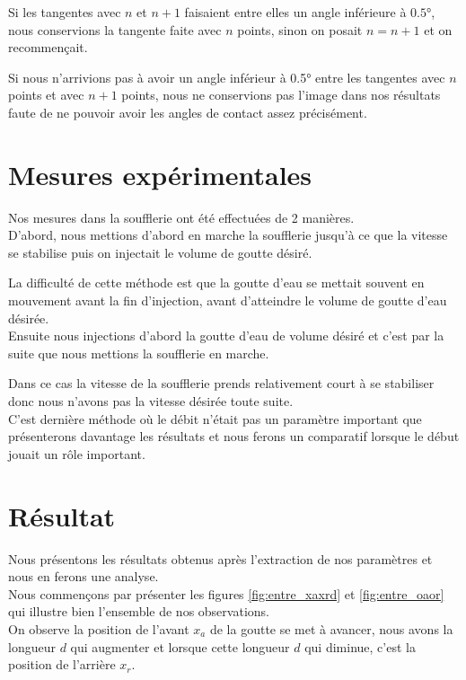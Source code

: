 \documentclass[french]{article}
\begin{document}
Si les tangentes avec $n$ et $n+1$ faisaient entre elles un angle inférieure à $\ang{0.5}$, nous conservions la tangente faite avec $n$ points, sinon on posait $n = n+1$ et on recommençait.

Si nous n'arrivions pas à avoir un angle inférieur à \ang{0.5}  entre les tangentes avec $n$ points et avec $n+1$ points, nous ne conservions pas l'image dans nos résultats faute de ne pouvoir avoir les angles de contact assez précisément.

\section{Mesures expérimentales}

Nos mesures dans la soufflerie ont été effectuées de 2 manières.\\

D'abord, nous mettions d'abord en marche la soufflerie jusqu'à ce que la vitesse se stabilise puis on injectait le volume de goutte désiré.

La difficulté de cette méthode est que la goutte d'eau se mettait souvent en mouvement avant la fin d'injection, avant d'atteindre le volume de goutte d'eau désirée.\\

Ensuite nous injections d'abord la goutte d'eau de volume désiré et c'est par la suite que nous mettions la soufflerie en marche.

Dans ce cas la vitesse de la soufflerie prends relativement court à se stabiliser donc nous n'avons pas la vitesse désirée toute suite.\\

C'est dernière méthode où le débit n'était pas un paramètre important que présenterons davantage les résultats et nous ferons un comparatif lorsque le début jouait un rôle important.
\newpage
\section{Résultat}

Nous présentons les résultats obtenus après l'extraction de nos paramètres et nous en ferons une analyse.\\
Nous commençons par présenter les figures \ref{fig:entre_xaxrd} et \ref{fig:entre_oaor} qui illustre bien l'ensemble de nos observations.\\

On observe la position de l'avant $x_{a}$ de la goutte se met à avancer, nous avons la longueur $d$ qui augmenter et lorsque cette longueur $d$ qui diminue, c'est la position de l'arrière $x_{r}$.
\end{document}
